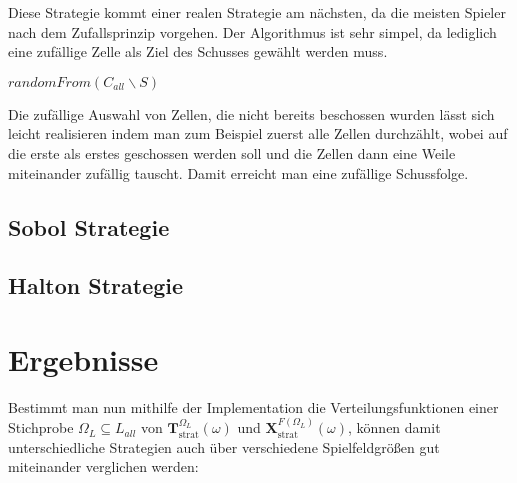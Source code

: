 \documentclass[a4paper,12pt]{llncs}
\numberwithin{equation}{section}
\DeclareMathOperator{\strat}{strat}
\begin{document}
Diese Strategie kommt einer realen Strategie am nächsten, da die meisten Spieler nach dem Zufallsprinzip vorgehen. Der Algorithmus ist sehr simpel, da lediglich eine zufällige Zelle als Ziel des Schusses gewählt werden muss.

\begin{tcolorbox}
	\begin{algorithmic}
		\State \Return $randomFrom(C_{all}\backslash S)$
		\EndFunction
	\end{algorithmic}
\end{tcolorbox}

Die zufällige Auswahl von Zellen, die nicht bereits beschossen wurden lässt sich leicht realisieren indem man zum Beispiel zuerst alle Zellen durchzählt, wobei auf die erste als erstes geschossen werden soll und die Zellen dann eine Weile miteinander zufällig tauscht. Damit erreicht man eine zufällige Schussfolge.


\subsection{Sobol Strategie}

\subsection{Halton Strategie}

\section{Ergebnisse}

Bestimmt man nun mithilfe der Implementation die Verteilungsfunktionen einer Stichprobe $\Omega_L \subseteq L_{all}$ von $\mathbf{T}^{\Omega_L}_{\strat}(\omega)$ und $\mathbf{X}^{F(\Omega_L)}_{\strat}(\omega)$, können damit unterschiedliche Strategien auch über verschiedene Spielfeldgrößen gut miteinander verglichen werden:

\newpage

% 
\end{document}

